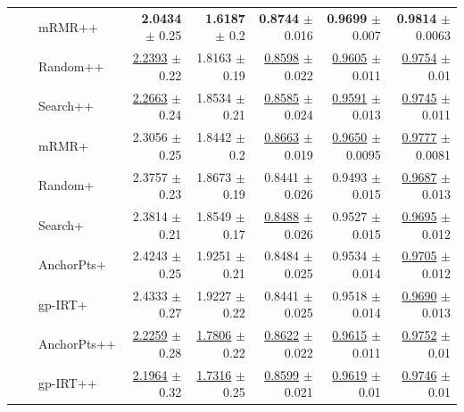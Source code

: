 \begin{longtable}{llp{}rrrrr}
 &  & mRMR++ & \textbf{2.0434} {\scriptsize $\pm$ 0.25} & \textbf{1.6187} {\scriptsize $\pm$ 0.2} & \textbf{0.8744} {\scriptsize $\pm$ 0.016} & \textbf{0.9699} {\scriptsize $\pm$ 0.007} & \textbf{0.9814} {\scriptsize $\pm$ 0.0063} \\
 &  & Random++ & \underline{2.2393} {\scriptsize $\pm$ 0.22} & 1.8163 {\scriptsize $\pm$ 0.19} & \underline{0.8598} {\scriptsize $\pm$ 0.022} & \underline{0.9605} {\scriptsize $\pm$ 0.011} & \underline{0.9754} {\scriptsize $\pm$ 0.01} \\
 &  & Search++ & \underline{2.2663} {\scriptsize $\pm$ 0.24} & 1.8534 {\scriptsize $\pm$ 0.21} & \underline{0.8585} {\scriptsize $\pm$ 0.024} & \underline{0.9591} {\scriptsize $\pm$ 0.013} & \underline{0.9745} {\scriptsize $\pm$ 0.011} \\
 &  & mRMR+ & 2.3056 {\scriptsize $\pm$ 0.25} & 1.8442 {\scriptsize $\pm$ 0.2} & \underline{0.8663} {\scriptsize $\pm$ 0.019} & \underline{0.9650} {\scriptsize $\pm$ 0.0095} & \underline{0.9777} {\scriptsize $\pm$ 0.0081} \\
 &  & Random+ & 2.3757 {\scriptsize $\pm$ 0.23} & 1.8673 {\scriptsize $\pm$ 0.19} & 0.8441 {\scriptsize $\pm$ 0.026} & 0.9493 {\scriptsize $\pm$ 0.015} & \underline{0.9687} {\scriptsize $\pm$ 0.013} \\
 &  & Search+ & 2.3814 {\scriptsize $\pm$ 0.21} & 1.8549 {\scriptsize $\pm$ 0.17} & \underline{0.8488} {\scriptsize $\pm$ 0.026} & 0.9527 {\scriptsize $\pm$ 0.015} & \underline{0.9695} {\scriptsize $\pm$ 0.012} \\
 &  & AnchorPts+ & 2.4243 {\scriptsize $\pm$ 0.25} & 1.9251 {\scriptsize $\pm$ 0.21} & 0.8484 {\scriptsize $\pm$ 0.025} & 0.9534 {\scriptsize $\pm$ 0.014} & \underline{0.9705} {\scriptsize $\pm$ 0.012} \\
 &  & gp-IRT+ & 2.4333 {\scriptsize $\pm$ 0.27} & 1.9227 {\scriptsize $\pm$ 0.22} & 0.8441 {\scriptsize $\pm$ 0.025} & 0.9518 {\scriptsize $\pm$ 0.014} & \underline{0.9690} {\scriptsize $\pm$ 0.013} \\
 &  & AnchorPts++ & \underline{2.2259} {\scriptsize $\pm$ 0.28} & \underline{1.7806} {\scriptsize $\pm$ 0.22} & \underline{0.8622} {\scriptsize $\pm$ 0.022} & \underline{0.9615} {\scriptsize $\pm$ 0.011} & \underline{0.9752} {\scriptsize $\pm$ 0.01} \\
 &  & gp-IRT++ & \underline{2.1964} {\scriptsize $\pm$ 0.32} & \underline{1.7316} {\scriptsize $\pm$ 0.25} & \underline{0.8599} {\scriptsize $\pm$ 0.021} & \underline{0.9619} {\scriptsize $\pm$ 0.01} & \underline{0.9746} {\scriptsize $\pm$ 0.01} \\

\end{longtable}
